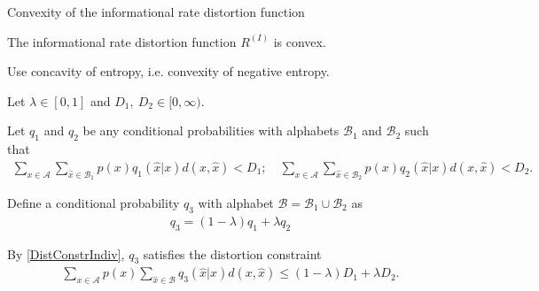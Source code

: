 \begin{frame}{Convexity of the informational rate distortion function}
\begin{proposition}[Convexity of $R^{(I)}$]
The informational rate distortion function $R^{(I)}$ is convex.
\end{proposition}
\vspace{-2.9mm}
\bit
\item {} Use concavity of entropy, i.e. convexity of negative entropy. 
\item Let $\lambda\in [0,1]$ and $D_1,\:D_2\in[0,\infty)$. %
%
%
\item Let $q_1$ and $q_2$ be any conditional probabilities with alphabets $\mathcal{B}_1$ and $\mathcal{B}_2$ such that
\begin{align}\label{DistConstrIndiv}
\sum_{x\in\mathcal{A}}\sum_{\hat{x}\in\mathcal{B}_1}p(x)q_1(\hat{x}|x)d(x,\hat{x})<D_1; \quad \sum_{x\in\mathcal{A}}\sum_{\hat{x}\in\mathcal{B}_2}p(x)q_2(\hat{x}|x)d(x,\hat{x})<D_2.
\end{align}

\item Define a conditional probability $q_3$ with alphabet $\mathcal{B}=\mathcal{B}_1\cup\mathcal{B}_2$ as 
\begin{align*}
q_3=(1-\lambda)q_1+\lambda q_2
\end{align*}
\item By \eqref{DistConstrIndiv}, $q_3$ satisfies the distortion constraint
\begin{align}\label{DistConstrQ3}
\sum_{x\in\mathcal{A}}p(x)\sum_{\hat{x}\in\mathcal{B}}q_3(\hat{x}|x)d(x,\hat{x}) \leq (1-\lambda)D_1+\lambda D_2. 
\end{align}
\eit
\end{frame}


